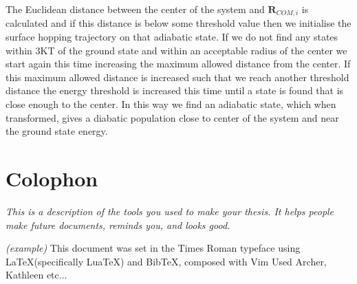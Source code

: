 The Euclidean distance between the center of the system and $\mathbf{R}_{COM, i}$ is calculated and if this distance is below some threshold value then we initialise the surface hopping trajectory on that adiabatic state. If we do not find any states within 3KT of the ground state and within an acceptable radius of the center we start again this time increasing the maximum allowed distance from the center. If this maximum allowed distance is increased such that we reach another threshold distance the energy threshold is increased this time until a state is found that is close enough to the center. In this way we find an adiabatic state, which when transformed, gives a diabatic population close to center of the system and near the ground state energy.



\chapter{Colophon}
\label{appendixlabel3}
\textit{This is a description of the tools you used to make your thesis. It helps people make future documents, reminds you, and looks good.}

\textit{(example)} This document was set in the Times Roman typeface using \LaTeX (specifically LuaTeX) and Bib\TeX , composed with Vim 
Used Archer, Kathleen etc...

